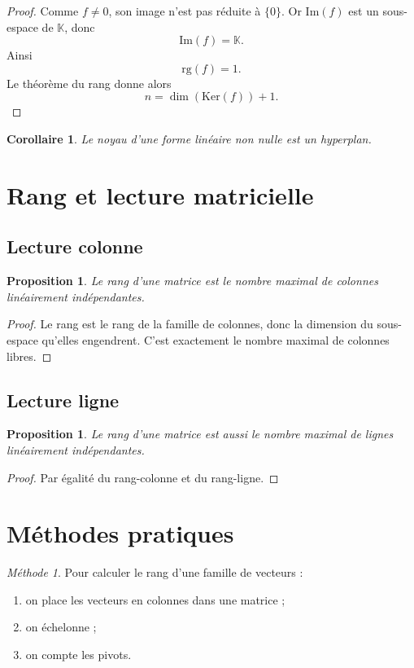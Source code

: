 \documentclass[11pt,a4paper]{article}
\newtheorem{proposition}[definition]{Proposition}
\newtheorem{corollaire}[definition]{Corollaire}
\theoremstyle{remark}
\newtheorem*{methode}{Méthode}
\newcommand{\K}{\mathbb{K}}
\newcommand{\Ker}{\mathrm{Ker}}
\newcommand{\Img}{\mathrm{Im}}
\newcommand{\rg}{\mathrm{rg}}
\begin{document}
\begin{proof}
Comme \(f\neq 0\), son image n’est pas réduite à \(\{0\}\). Or \(\Img(f)\) est un sous-espace de \(\K\), donc
\[
\Img(f)=\K.
\]
Ainsi
\[
\rg(f)=1.
\]
Le théorème du rang donne alors
\[
n=\dim(\Ker(f))+1.
\]
\end{proof}

\begin{corollaire}
Le noyau d’une forme linéaire non nulle est un hyperplan.
\end{corollaire}

\section{Rang et lecture matricielle}

\subsection{Lecture colonne}

\begin{proposition}
Le rang d’une matrice est le nombre maximal de colonnes linéairement indépendantes.
\end{proposition}

\begin{proof}
Le rang est le rang de la famille de colonnes, donc la dimension du sous-espace qu’elles engendrent. C’est exactement le nombre maximal de colonnes libres.
\end{proof}

\subsection{Lecture ligne}

\begin{proposition}
Le rang d’une matrice est aussi le nombre maximal de lignes linéairement indépendantes.
\end{proposition}

\begin{proof}
Par égalité du rang-colonne et du rang-ligne.
\end{proof}

\section{Méthodes pratiques}

\begin{methode}
Pour calculer le rang d’une famille de vecteurs :
\begin{enumerate}
    \item on place les vecteurs en colonnes dans une matrice ;
    \item on échelonne ;
    \item on compte les pivots.
\end{enumerate}
\end{methode}
\end{document}
